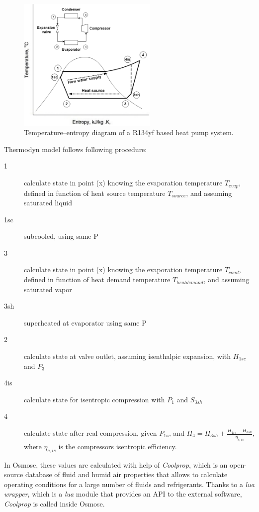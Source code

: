 \documentclass{article}
\begin{document}
\begin{figure}[h!]
	\centering
	\includegraphics[width=0.6\textwidth]{HP_cylce_ref.png}
	\caption{Temperature–entropy diagram of a R134yf based heat pump system.}
	\label{fig:hp_ref}
\end{figure}

Thermodyn model follows following procedure:
\begin{description}
    \item[1] calculate state in point (x) knowing the evaporation temperature $T_{evap}$, defined in function of heat source temperature $T_{source}$, and assuming saturated liquid
    \item[1sc] subcooled, using same P
    \item[3] calculate state in point (x) knowing the evaporation temperature $T_{cond}$, defined in function of heat demand temperature $T_{heat demand}$, and assuming saturated vapor
    \item[3sh] superheated at evaporator using same P
    \item[2] calculate state at valve outlet, assuming isenthalpic expansion, with $H_{1sc}$ and $P_{3}$
    \item[4is] calculate state for isentropic compression with $P_{1}$ and $S_{3sh}$
    \item[4] calculate state after real compression, given $P_{1sc}$ and $H_{4} = H_{3sh} + \frac{H_{4is} - H_{3sh}}{\eta_{c,is}}$, where $\eta_{c,is}$ is the compressors isentropic efficiency. 
\end{description}

In Osmose, these values are calculated with help of \textit{Coolprop}, which is an open-source database of fluid and humid air properties that allows to calculate operating conditions for a large number of fluids and refrigerants. Thanks to a \textit{lua wrapper}, which is a \textit{lua} module that provides an API to the external software, \textit{Coolprop} is called inside Osmose.
\end{document}
